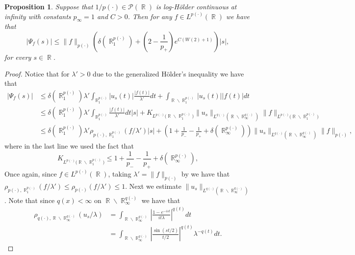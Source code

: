 \documentclass[11pt,reqno]{amsart}
\newtheorem{prop}[theorem]{Proposition}
\theoremstyle{definition}
\theoremstyle{definition}
\theoremstyle{definition}
\DeclareMathOperator{\R}{\mathbb{R}}
\newcommand{\p}{p(\cdot)}
\newcommand{\Lp}{L^{\p}(\R)}
\begin{document}
\begin{prop}\label{coro_rapid_decay}
     Suppose that $1/p(\cdot)\in \mathcal{P}(\R)$ is log-Hölder continuous at infinity with constants $p_{\infty}=1$ and $C>0$. Then for any $f\in L^{p(\cdot)}(\R)$ we have that
    \begin{equation}\label{ineq_Psi_log-holder}
        |\Psi_f(s)|\leq \|f\|_{\p}\left(\delta\left(\R^{\p}_1\right)+\left(2-\frac{1}{p_{+}}\right)e^{C(W(2)+1)}\right)|s|,
    \end{equation}
    for every $s\in\R$.
\end{prop}
\begin{proof}
Notice that for $\lambda'>0$  due to the generalized Hölder's inequality we have that
 \begin{align*}
     |{\Psi_f(s)}|&\leq\delta\left(\R^{\p}_1\right){\lambda'}\int_{\R^{\p}_1}|u_s(t)|\frac{|f(t)|}{\lambda'}dt+\int_{\R\backslash\R^{\p}_1}|u_s(t)||f(t)|dt\\
     &\leq \delta\left(\R^{\p}_1\right)\lambda'\int_{\R^{\p}_1}\frac{|f(t)|}{\lambda'}dt|s|+K_{L^{\p}({\R\backslash\R^{\p}_1)}}\|u_s\|_{L^{q(\cdot)}(\R\backslash\R_{\infty}^{q(\cdot)})}\|f\|_{L^{\p}({\R\backslash\R^{\p}_1)}}\\
     &\leq \delta\left(\R^{\p}_1\right)\lambda'\rho_{\p,\R^{\p}_1}(f/\lambda')|s|+\left(1+\frac{1}{p_{-}}-\frac{1}{p_{+}}+\delta\left(\R_{\infty}^{\p}\right)\right)\|u_s\|_{L^{q(\cdot)}(\R\backslash\R_{\infty}^{q(\cdot)})}\|f\|_{\p},
 \end{align*}
    where in the last line we used the fact that 
    \begin{equation*}
        K_{L^{\p}({\R\backslash\R^{\p}_1)}}\leq1+\frac{1}{p_{-}}-\frac{1}{p_{+}}+\delta\left(\R_{\infty}^{\p}\right),
    \end{equation*}
   Once again, since $f\in \Lp$, taking  $\lambda'=\|f\|_{\p}$ by \cite[Proposition 2.21]{Cruz-Uribe} we have that $\rho_{\p,\R^{\p}_1}(f/\lambda')\leq \rho_{\p}(f/\lambda')\leq1$.  Next we estimate $\|u_s\|_{L^{q(\cdot)}(\R\backslash\R_{\infty}^{q(\cdot)})}$.
    Note that since $q(x)<\infty$ on $\R\backslash\R_{\infty}^{q(\cdot)}$ we have that
    \begin{align*}
        \rho_{q(\cdot),\R\backslash\R_{\infty}^{q(\cdot)}}(u_s/\lambda)&=\int_{\R\backslash\R_{\infty}^{q(\cdot)}}\left|\frac{1-e^{-ist}}{it\lambda}\right|^{q(t)}dt\\
        &=\int_{\R\backslash\R_{\infty}^{q(\cdot)}}\left|\frac{\sin(st/2)}{t/2}\right|^{q(t)}\lambda^{-q(t)}dt.
    \end{align*}

\end{proof}
\end{document}
